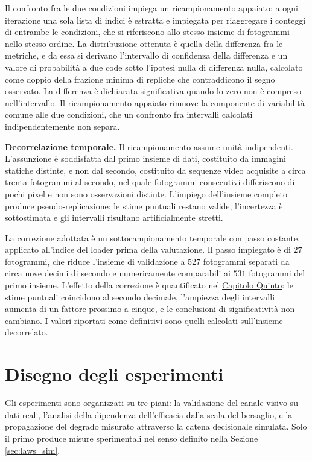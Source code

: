 \documentclass[a4paper,12pt]{report}
\begin{document}
Il confronto fra le due condizioni impiega un ricampionamento appaiato: a ogni
iterazione una sola lista di indici è estratta e impiegata per riaggregare i
conteggi di entrambe le condizioni, che si riferiscono allo stesso insieme di
fotogrammi nello stesso ordine. La distribuzione ottenuta è quella della
differenza fra le metriche, e da essa si derivano l'intervallo di confidenza
della differenza e un valore di probabilità a due code sotto l'ipotesi nulla di
differenza nulla, calcolato come doppio della frazione minima di repliche che
contraddicono il segno osservato. La differenza è dichiarata significativa
quando lo zero non è compreso nell'intervallo. Il ricampionamento appaiato
rimuove la componente di variabilità comune alle due condizioni, che un
confronto fra intervalli calcolati indipendentemente non separa.

\textbf{Decorrelazione temporale.}
\label{sec:decorrelazione}
Il ricampionamento assume unità indipendenti. L'assunzione è soddisfatta dal
primo insieme di dati, costituito da immagini statiche distinte, e non dal
secondo, costituito da sequenze video acquisite a circa trenta fotogrammi al
secondo, nel quale fotogrammi consecutivi differiscono di pochi pixel e non
sono osservazioni distinte. L'impiego dell'insieme completo produce
pseudo-replicazione: le stime puntuali restano valide, l'incertezza è
sottostimata e gli intervalli risultano artificialmente stretti.

La correzione adottata è un sottocampionamento temporale con passo costante,
applicato all'indice del loader prima della valutazione. Il passo impiegato è di
$27$ fotogrammi, che riduce l'insieme di validazione a $527$ fotogrammi separati
da circa nove decimi di secondo e numericamente comparabili ai $531$ fotogrammi
del primo insieme. L'effetto della correzione è quantificato nel \hyperref[cap5]{Capitolo Quinto}: le stime puntuali coincidono al secondo decimale,
l'ampiezza degli intervalli aumenta di un fattore prossimo a cinque, e le
conclusioni di significatività non cambiano. I valori riportati come definitivi
sono quelli calcolati sull'insieme decorrelato.

\section{Disegno degli esperimenti}
\label{sec:esperimenti}

Gli esperimenti sono organizzati su tre piani: la validazione del canale visivo
su dati reali, l'analisi della dipendenza dell'efficacia dalla scala del
bersaglio, e la propagazione del degrado misurato attraverso la catena
decisionale simulata. Solo il primo produce misure sperimentali nel senso
definito nella Sezione \ref{sec:laws_sim}.
\end{document}
